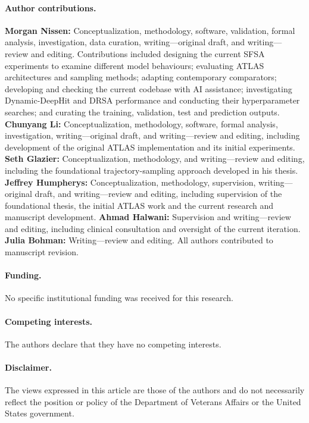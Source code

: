 \paragraph{Author contributions.}
\textbf{Morgan Nissen:} Conceptualization, methodology, software, validation, formal analysis, investigation, data curation, writing---original draft, and writing---review and editing. Contributions included designing the current SFSA experiments to examine different model behaviours; evaluating ATLAS architectures and sampling methods; adapting contemporary comparators; developing and checking the current codebase with AI assistance; investigating Dynamic-DeepHit and DRSA performance and conducting their hyperparameter searches; and curating the training, validation, test and prediction outputs. \textbf{Chunyang Li:} Conceptualization, methodology, software, formal analysis, investigation, writing---original draft, and writing---review and editing, including development of the original ATLAS implementation and its initial experiments. \textbf{Seth Glazier:} Conceptualization, methodology, and writing---review and editing, including the foundational trajectory-sampling approach developed in his thesis. \textbf{Jeffrey Humpherys:} Conceptualization, methodology, supervision, writing---original draft, and writing---review and editing, including supervision of the foundational thesis, the initial ATLAS work and the current research and manuscript development. \textbf{Ahmad Halwani:} Supervision and writing---review and editing, including clinical consultation and oversight of the current iteration. \textbf{Julia Bohman:} Writing---review and editing. All authors contributed to manuscript revision.

\paragraph{Funding.}
No specific institutional funding was received for this research.

\paragraph{Competing interests.}
The authors declare that they have no competing interests.

\paragraph{Disclaimer.}
The views expressed in this article are those of the authors and do not necessarily reflect the position or policy of the Department of Veterans Affairs or the United States government.

